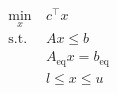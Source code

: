 \documentclass[preview]{standalone}
\begin{document}
\begin{align*}
\begin{aligned}\min_{x} &\   c  ^\top x \\\text{s.t.} &\   A   x \leq   b   \\&\ A_\text{eq} x = b_\text{eq} \\&\ l \leq x \leq u \end{aligned}
\end{align*}
\end{document}
